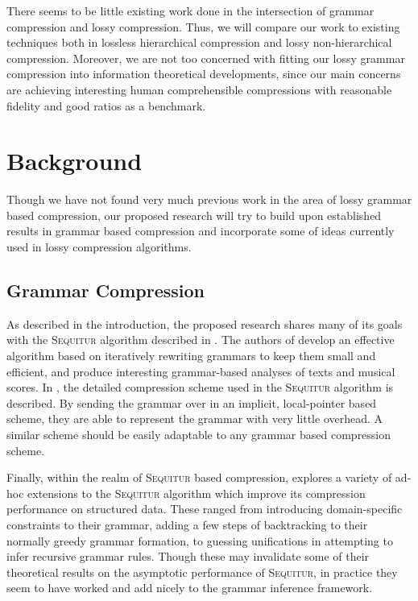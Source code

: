 \documentclass[11pt]{article}
\newcommand{\Sequitur}{\textsc{Sequitur}\xspace}
\begin{document}
There seems to be little existing work done in the intersection of grammar
compression and lossy compression.  Thus, we will compare our work to existing
techniques both in lossless hierarchical compression and lossy non-hierarchical
compression.  Moreover, we are not too concerned with fitting our lossy
grammar compression into information theoretical developments, since
our main concerns are achieving interesting human comprehensible compressions
with reasonable fidelity and good ratios as a benchmark.

\section{Background}

Though we have not found very much previous work in the area of lossy grammar
based compression, our proposed research will try to build upon established
results in grammar based compression and incorporate some of ideas currently
used in lossy compression algorithms.

\subsection{Grammar Compression}

As described in the introduction, the proposed research shares many of its
goals with the \Sequitur algorithm described in \cite{sequitur}.  The authors
of \cite{sequitur} develop an effective algorithm based on iteratively
rewriting grammars to keep them small and efficient, and produce interesting
grammar-based analyses of texts and musical scores.  In \cite{sequitur2}, the
detailed compression scheme used in the \Sequitur algorithm is described.  By
sending the grammar over in an implicit, local-pointer based scheme, they are
able to represent the grammar with very little overhead.  A similar scheme
should be easily adaptable to any grammar based compression scheme.

Finally, within the realm of \Sequitur based compression, \cite{nevillphd}
explores a variety of ad-hoc extensions to the \Sequitur algorithm which
improve its compression performance on structured data.  These ranged from
introducing domain-specific constraints to their grammar, adding a few steps of
backtracking to their normally greedy grammar formation, to guessing
unifications in attempting to infer recursive grammar rules.  Though these may
invalidate some of their theoretical results on the asymptotic performance of
\Sequitur, in practice they seem to have worked and add nicely to the grammar
inference framework.
\end{document}
